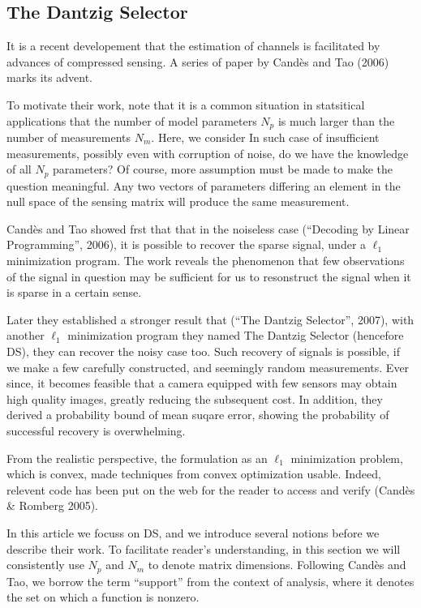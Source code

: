 \subsection{The Dantzig Selector}

It is a recent developement that the estimation of channels is facilitated by advances of compressed sensing.
A series of paper by Cand\`es and Tao (2006) marks its advent.

To motivate their work, note that it is a common situation in statsitical applications that the number of model parameters \(N_p\) is much larger than the number of measurements \(N_m\).
Here, we consider
%
In such case of insufficient measurements, possibly even with corruption of noise, do we have the knowledge of all \(N_p\) parameters?
Of course, more assumption must be made to make the question meaningful.
Any two vectors of parameters differing an element in the null space of the sensing matrix will produce the same measurement.

Cand\`es and Tao showed frst that that in the noiseless case (``Decoding by Linear Programming'', 2006), it is possible to recover the sparse signal, under a \(\ell_1\) minimization program.
The work reveals the phenomenon that few observations of the signal in question may be sufficient for us to resonstruct the signal when it is sparse in a certain sense.

Later they established a stronger result that (``The Dantzig Selector'', 2007), with another \(\ell_1\) minimization program they named The Dantzig Selector (hencefore DS), they can recover the noisy case too.
Such recovery of signals is possible, if we make a few carefully constructed, and seemingly random measurements.
Ever since, it becomes feasible that a camera equipped with few sensors may obtain high quality images, greatly reducing the subsequent cost.
In addition, they derived a probability bound of mean suqare error, showing the probability of successful recovery is overwhelming.

From the realistic perspective, the formulation as an \(\ell_1\) minimization problem, which is convex, made techniques from convex optimization usable.
Indeed, relevent code has been put on the web for the reader to access and verify (Cand\`es \& Romberg 2005).

In this article we focuss on DS, and we introduce several notions before we describe their work.
To facilitate reader's understanding, in this section we will consistently use \(N_p\) and \(N_m\) to denote matrix dimensions.
Following Cand\`es and Tao, we borrow the term ``support'' from the context of analysis, where it denotes the set on which a function is nonzero.

